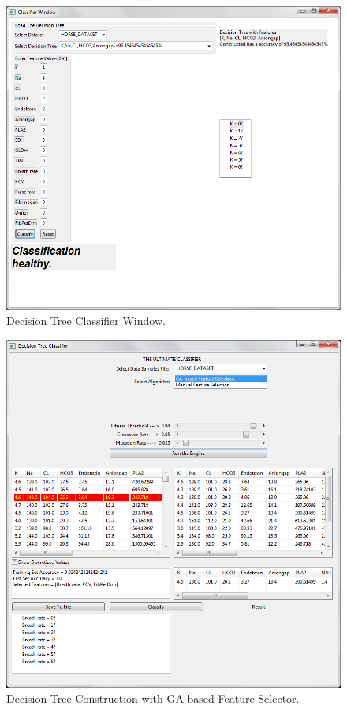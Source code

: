 \documentclass[12pt]{report}
\begin{document}
\begin{figure}[h!]
  
  \centering
    \includegraphics[scale=0.45]{dt_classification_window.png}
\caption{Decision Tree Classifier Window.}
\end{figure}
\begin{figure}[h!]
  
  \centering
    \includegraphics[scale=0.45]{dt_ga_algorithm.png}
\caption{Decision Tree Construction with GA based Feature Selector.}
\end{figure}
\end{document}
